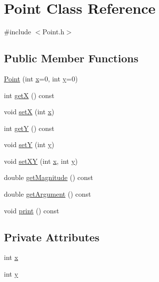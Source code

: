\hypertarget{classPoint}{}\section{Point Class Reference}
\label{classPoint}


{\ttfamily \#include $<$Point.\+h$>$}

\subsection*{Public Member Functions}
\begin{DoxyCompactItemize}
\item 
\hyperlink{classPoint_a1c8a6881ed0f11828299033c5959d147}{Point} (int \hyperlink{classPoint_a8c779e11e694b20e0946105a9f5de842}{x}=0, int \hyperlink{classPoint_a2e1b5fb2b2a83571f5c0bc0f66a73cf7}{y}=0)
\item 
int \hyperlink{classPoint_abe622fffc8785b0c2e06cdac681b9837}{getX} () const 
\item 
void \hyperlink{classPoint_acdc86ab607b2ae8415152883e2629015}{setX} (int \hyperlink{classPoint_a8c779e11e694b20e0946105a9f5de842}{x})
\item 
int \hyperlink{classPoint_a10f31e48e2dbc22e3660ca769b8d5d65}{getY} () const 
\item 
void \hyperlink{classPoint_afccad787a359f062efc1af5e935a99ba}{setY} (int \hyperlink{classPoint_a2e1b5fb2b2a83571f5c0bc0f66a73cf7}{y})
\item 
void \hyperlink{classPoint_afb6a0c9ad81c0864e4039069f0f33d80}{set\+XY} (int \hyperlink{classPoint_a8c779e11e694b20e0946105a9f5de842}{x}, int \hyperlink{classPoint_a2e1b5fb2b2a83571f5c0bc0f66a73cf7}{y})
\item 
double \hyperlink{classPoint_a96a23567344de8c84468a96f97c2448f}{get\+Magnitude} () const 
\item 
double \hyperlink{classPoint_ae53cf4bc004996960585a70948a21cb6}{get\+Argument} () const 
\item 
void \hyperlink{classPoint_a20b27dff6a871012fa5e7c0d52fd6b98}{print} () const 
\end{DoxyCompactItemize}
\subsection*{Private Attributes}
\begin{DoxyCompactItemize}
\item 
int \hyperlink{classPoint_a8c779e11e694b20e0946105a9f5de842}{x}
\item 
int \hyperlink{classPoint_a2e1b5fb2b2a83571f5c0bc0f66a73cf7}{y}
\end{DoxyCompactItemize}


